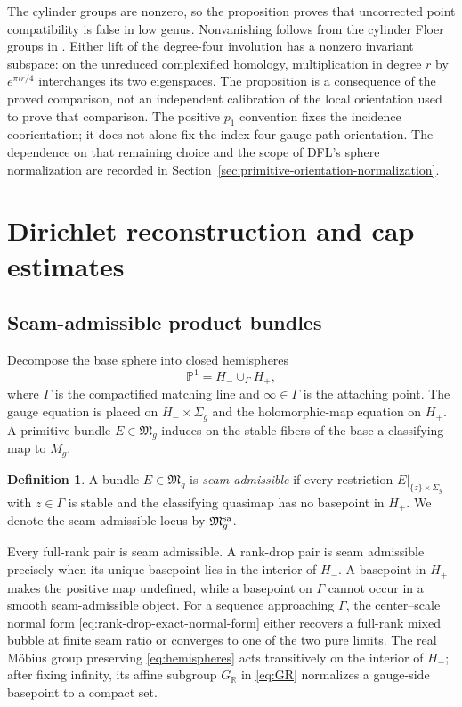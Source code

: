 \documentclass[11pt]{amsart}
\theoremstyle{definition}
\newtheorem{definition}[theorem]{Definition}
\theoremstyle{remark}
\theoremstyle{plain}
\newcommand{\RR}{\mathbb{R}}
\newcommand{\PP}{\mathbb{P}}
\newcommand{\frakM}{\mathfrak{M}}
\begin{document}
The cylinder groups are nonzero, so the proposition proves that
uncorrected point compatibility is false in low genus.
Nonvanishing follows from the cylinder Floer groups in
\cite{Munoz99a}. Either lift of the degree-four involution
has a nonzero invariant subspace: on the unreduced
complexified homology, multiplication in degree $r$ by
$e^{\pi i r/4}$ interchanges its two eigenspaces.
The proposition is a consequence of the proved comparison,
not an independent calibration of the local orientation
used to prove that comparison.
The positive $p_1$ convention fixes the incidence coorientation;
it does not alone fix the index-four gauge-path orientation.
The dependence on that remaining choice and the scope of
DFL's sphere normalization are recorded in
Section~\ref{sec:primitive-orientation-normalization}.

\section{Dirichlet reconstruction and cap estimates}
\label{sec:reconstruction}

\subsection{Seam-admissible product bundles}\label{sec:seam-admissible}
Decompose the base sphere into closed hemispheres
\begin{equation}\label{eq:hemispheres}
                         \PP^1=H_-\cup_\Gamma H_+,
\end{equation}
where $\Gamma$ is the compactified matching line and
$\infty\in\Gamma$ is the attaching point.  The gauge equation is placed
on $H_-\times\Sigma_g$ and the holomorphic-map equation on $H_+$.  A
primitive bundle $E\in\frakM_g$ induces on the stable fibers of the base a
classifying map to $M_g$.

\begin{definition}\label{def:seam-admissible}
A bundle $E\in\frakM_g$ is \emph{seam admissible} if every restriction
$E|_{\{z\}\times\Sigma_g}$ with $z\in\Gamma$ is stable and the
classifying quasimap has no basepoint in $H_+$.  We denote the
seam-admissible locus by $\frakM_g^{\rm sa}$.
\end{definition}

Every full-rank pair is seam admissible.  A rank-drop pair is seam
admissible precisely when its unique basepoint lies in the interior of
$H_-$.  A basepoint in $H_+$ makes the positive map undefined, while a
basepoint on $\Gamma$ cannot occur in a smooth seam-admissible object.  For
a sequence approaching $\Gamma$, the center--scale normal form
\eqref{eq:rank-drop-exact-normal-form} either recovers a full-rank mixed
bubble at finite seam ratio or converges to one of the two pure limits.
The real M\"obius group preserving
\eqref{eq:hemispheres} acts transitively on the interior of $H_-$; after
fixing infinity, its affine subgroup $G_\RR$ in \eqref{eq:GR} normalizes a
gauge-side basepoint to a compact set.
\end{document}
